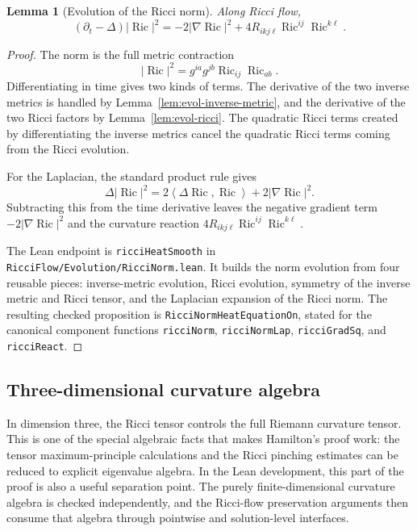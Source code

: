 \documentclass[11pt]{article}
\theoremstyle{plain}
\newtheorem{lemma}[theorem]{Lemma}
\theoremstyle{definition}
\theoremstyle{remark}
\newcommand{\Ric}{\operatorname{Ric}}
\newcommand{\ip}[2]{\left\langle #1,#2\right\rangle}
\newcommand{\norm}[1]{\left|#1\right|}
\newcommand{\leanref}[1]{\nolinkurl{#1}}
\newcommand{\leanfile}[1]{\nolinkurl{#1}}
\newcommand{\rffile}[1]{\leanfile{#1}}
\begin{document}
\begin{lemma}[Evolution of the Ricci norm]
\label{lem:evol-ricci-norm}
Along Ricci flow,
\[
(\partial_t-\Delta)\norm{\Ric}^2
=
-2\norm{\nabla\Ric}^2
+4R_{ikj\ell}\Ric^{ij}\Ric^{k\ell}.
\]
\end{lemma}

\begin{proof}
The norm is the full metric contraction
\[
  \norm{\Ric}^2
  =
  g^{ia}g^{jb}\Ric_{ij}\Ric_{ab}.
\]
Differentiating in time gives two kinds of terms.  The derivative of the two
inverse metrics is handled by Lemma~\ref{lem:evol-inverse-metric}, and the
derivative of the two Ricci factors by Lemma~\ref{lem:evol-ricci}.  The
quadratic Ricci terms created by differentiating the inverse metrics cancel the
quadratic Ricci terms coming from the Ricci evolution.

For the Laplacian, the standard product rule gives
\[
  \Delta\norm{\Ric}^2
  =
  2\ip{\Delta\Ric}{\Ric}
  +
  2\norm{\nabla\Ric}^2.
\]
Subtracting this from the time derivative leaves the negative gradient term
\(-2\norm{\nabla\Ric}^2\) and the curvature reaction
\(4R_{ikj\ell}\Ric^{ij}\Ric^{k\ell}\).

The Lean endpoint is \leanref{ricciHeatSmooth} in
\rffile{RicciFlow/Evolution/RicciNorm.lean}.  It builds the norm evolution from
four reusable pieces: inverse-metric evolution, Ricci evolution, symmetry of the
inverse metric and Ricci tensor, and the Laplacian expansion of the Ricci norm.
The resulting checked proposition is \leanref{RicciNormHeatEquationOn}, stated
for the canonical component functions \leanref{ricciNorm}, \leanref{ricciNormLap},
\leanref{ricciGradSq}, and \leanref{ricciReact}.
\end{proof}

\subsection{Three-dimensional curvature algebra}

In dimension three, the Ricci tensor controls the full Riemann curvature tensor.
This is one of the special algebraic facts that makes Hamilton's proof work:
the tensor maximum-principle calculations and the Ricci pinching estimates can
be reduced to explicit eigenvalue algebra.  In the Lean development, this part
of the proof is also a useful separation point.  The purely finite-dimensional
curvature algebra is checked independently, and the Ricci-flow preservation
arguments then consume that algebra through pointwise and solution-level
interfaces.
\end{document}
